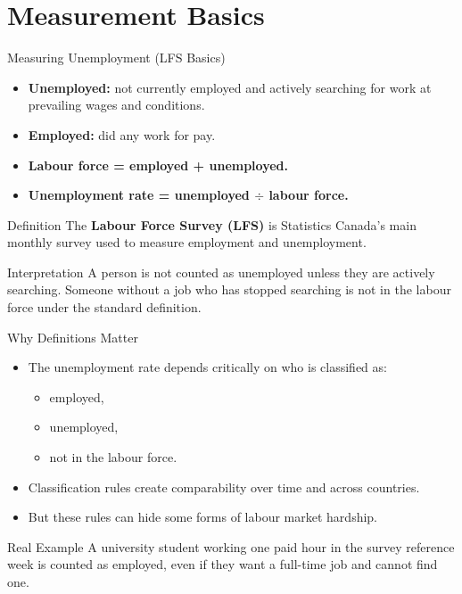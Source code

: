 \documentclass[aspectratio=169]{beamer}
\begin{document}
\section{Measurement Basics}

\begin{frame}{Measuring Unemployment (LFS Basics)}
\transfade
\begin{itemize}[<+->]
  \item \textbf{Unemployed:} not currently employed and actively searching for work at prevailing wages and conditions.
  \item \textbf{Employed:} did any work for pay.
  \item \textbf{Labour force = employed + unemployed.}
  \item \textbf{Unemployment rate = unemployed \(\div\) labour force.}
\end{itemize}

\begin{block}{Definition}
The \textbf{Labour Force Survey (LFS)} is Statistics Canada's main monthly survey used to measure employment and unemployment.
\end{block}

\begin{block}{Interpretation}
A person is not counted as unemployed unless they are actively searching. Someone without a job who has stopped searching is not in the labour force under the standard definition.
\end{block}
\end{frame}

\begin{frame}{Why Definitions Matter}
\transfade
\begin{itemize}[<+->]
  \item The unemployment rate depends critically on who is classified as:
  \begin{itemize}[<+->]
    \item employed,
    \item unemployed,
    \item not in the labour force.
  \end{itemize}
  \item Classification rules create comparability over time and across countries.
  \item But these rules can hide some forms of labour market hardship.
\end{itemize}

\begin{exampleblock}{Real Example}
A university student working one paid hour in the survey reference week is counted as employed, even if they want a full-time job and cannot find one.
\end{exampleblock}
\end{frame}
\end{document}
